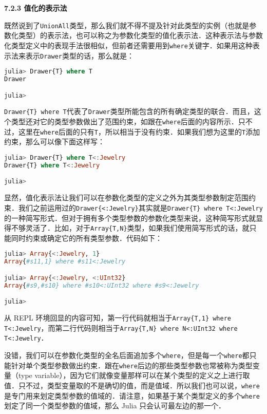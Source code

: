 \textbf{7.2.3 值化的表示法}

既然说到了\verb|UnionAll|类型，那么我们就不得不提及针对此类型的实例（也就是参数化类型）的表示法，也可以称之为参数化类型的值化表示法．这种表示法与参数化类型定义中的表现手法很相似，但前者还需要用到\verb|where|关键字．如果用这种表示法来表示\verb|Drawer|类型的话，那么就是：
\begin{lstlisting}[language=julia]
julia> Drawer{T} where T
Drawer

julia> 
\end{lstlisting}

\verb|Drawer{T} where T|代表了\verb|Drawer|类型所能包含的所有确定类型的联合．而且，这个类型还对它的类型参数做出了范围约束，如跟在\verb|where|后面的内容所示．只不过，这里在\verb|where|后面的只有\verb|T|，所以相当于没有约束．如果我们想为这里的\verb|T|添加约束，那么可以像下面这样写：
\begin{lstlisting}[language=julia]
julia> Drawer{T} where T<:Jewelry
Drawer{T} where T<:Jewelry

julia> 
\end{lstlisting}

显然，值化表示法让我们可以在参数化类型的定义之外为其类型参数制定范围约束．我们之前运用过的\verb|Drawer{<:Jewelry}|其实就是\verb|Drawer{T} where T<:Jewelry|的一种简写形式．但对于拥有多个类型参数的参数化类型来说，这种简写形式就显得不够灵活了．比如，对于\verb|Array{T,N}|类型，如果我们使用简写形式的话，就只能同时约束或确定它的所有类型参数．代码如下：
\begin{lstlisting}[language=julia]
julia> Array{<:Jewelry, 1}
Array{#s11,1} where #s11<:Jewelry

julia> Array{<:Jewelry, <:UInt32}
Array{#s9,#s10} where #s10<:UInt32 where #s9<:Jewelry

julia> 
\end{lstlisting}

从 REPL 环境回显的内容可知，第一行代码就相当于\verb|Array{T,1} where T<:Jewelry|，而第二行代码则相当于\verb|Array{T,N} where N<:UInt32 where T<:Jewelry|．

没错，我们可以在参数化类型的全名后面追加多个\verb|where|，但是每一个\verb|where|都只能针对单个类型参数做出约束．跟在\verb|where|后边的那些类型参数也常被称为类型变量（type variable），因为它们就像变量那样可以在某个类型的定义之上进行取值．只不过，类型变量取的不是确切的值，而是值域．所以我们也可以说，\verb|where|是专门用来划定类型参数的值域的．请注意，如果基于某个类型定义的多个\verb|where|划定了同一个类型参数的值域，那么 Julia 只会认可最左边的那一个．

